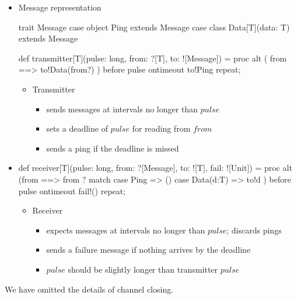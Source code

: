 \documentclass{concdistfoils}
\begin{document}
\begin{slide}
\begin{itemize}
\item Message representation
\begin{scala}
  trait Message
  case  object  Ping             extends Message {}
  case  class   Data[T](data: T) extends Message {}
\end{scala}
\vfill
\begin{scala}
  def transmitter[T](pulse: long, from: ?[T], to: ![Message]) = 
  proc 
  { alt ( from ==> { to!Data(from?) }
        ) before pulse ontimeout { to!Ping } repeat;
  } 
\end{scala}
\vfill
\begin{itemize}
\item Transmitter 
\begin{itemize}
\item sends messages at intervals no longer than $pulse$
\item sets a deadline of $pulse$ for reading from $from$
\item sends a ping if the deadline is missed
\end{itemize}
\end{itemize}
\end{itemize}
\end{slide}

\begin{slide}
\begin{itemize}
\item []
\begin{scala}
  def receiver[T](pulse: long, from: ?[Message], to: ![T], fail: ![Unit]) = 
    proc 
    { alt (from ==>
           { from ? match
             { case Ping      => ()
               case Data(d:T) => to!d
             }
           }
          ) before pulse ontimeout { fail!() } repeat;
    }
\end{scala}
\vfill
\begin{itemize}
\item Receiver 
\begin{itemize}
\item expects messages at intervals no longer than $pulse$; discards pings
\item sends a failure message if nothing arrives by the deadline
\item $pulse$ should be slightly longer than transmitter $pulse$
\end{itemize}
\end{itemize}
\end{itemize}
\begin{note}
We have omitted the details of channel closing.
\end{note}
\end{slide}
\end{document}
